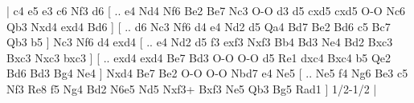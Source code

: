 \makegametitle 
|   c4   e5    e3   c6    Nf3   d6 [ .. e4  Nd4 Nf6  Be2 Be7  Nc3 O-O  d3 d5  cxd5 cxd5  O-O Nc6  Qb3 Nxd4  exd4 Bd6   ]  [ .. d6  Nc3 Nf6  d4 e4  Nd2 d5  Qa4 Bd7  Be2 Bd6  c5 Bc7  Qb3 b5   ]  Nc3   Nf6    d4   exd4 [ .. e4  Nd2 d5  f3 exf3  Nxf3 Bb4  Bd3 Ne4  Bd2 Bxc3  Bxc3 Nxc3  bxc3   ]  [ .. exd4  exd4 Be7  Bd3 O-O  O-O d5  Re1 dxc4  Bxc4 b5  Qe2 Bd6  Bd3 Bg4  Ne4   ]  Nxd4   Be7    Be2   O-O    O-O   Nbd7    e4   Ne5    [ .. Ne5  f4 Ng6  Be3 c5  Nf3 Re8  f5 Ng4  Bd2 N6e5  Nd5 Nxf3+  Bxf3 Ne5  Qb3 Bg5  Rad1   ] 1/2-1/2  |
